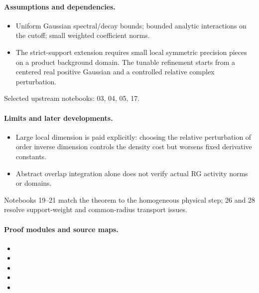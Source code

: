 \paragraph{Assumptions and dependencies.}
\begin{itemize}
\item Uniform Gaussian spectral/decay bounds; bounded analytic interactions on the cutoff; small weighted coefficient norms.
\item The strict-support extension requires small local symmetric precision pieces on a product background domain. The tunable refinement starts from a centered real positive Gaussian and a controlled relative complex perturbation.
\end{itemize}

Selected upstream notebooks: 03, 04, 05, 17.\par

\paragraph{Limits and later developments.}
\begin{itemize}
\item Large local dimension is paid explicitly: choosing the relative perturbation of order inverse dimension controls the density cost but worsens fixed derivative constants.
\item Abstract overlap integration alone does not verify actual RG activity norms or domains.
\end{itemize}

Notebooks 19--21 match the theorem to the homogeneous physical step; 26 and 28 resolve support-weight and common-radius transport issues.

\paragraph{Proof modules and source maps.}
\begingroup\small
\begin{itemize}
\item {}
\item {}
\item {}
\item {}
\item {}
\end{itemize}
\endgroup

